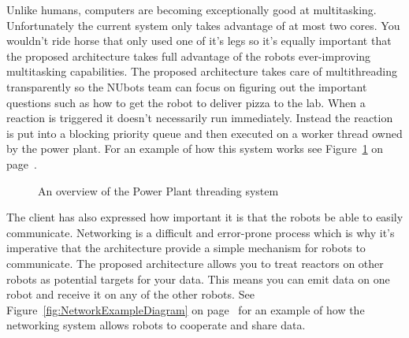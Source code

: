 \documentclass[english,12pt]{scrartcl}
\begin{document}
            Unlike humans, computers are becoming exceptionally good at multitasking. Unfortunately the current system only takes advantage of at most two cores. You wouldn't 
            ride horse that only used one of it's legs so it's equally important that the proposed architecture takes full advantage of the robots ever-improving multitasking 
            capabilities. The proposed architecture takes care of multithreading transparently so the NUbots team can focus on figuring out the important questions such as
            how to get the robot to deliver pizza to the lab. When a reaction is triggered it doesn't necessarily run immediately. Instead the reaction is put into a blocking priority queue
            and then executed on a worker thread owned by the power plant. For an example of how this system works see 
            Figure~\ref{fig:PowerPlantThreadingOverviewDiagram} on page~\pageref{fig:PowerPlantThreadingOverviewDiagram}.
            
            \begin{figure}[b]
                \begin{tikzpicture}
                \end{tikzpicture}
                \caption {An overview of the Power Plant threading system} \label{fig:PowerPlantThreadingOverviewDiagram}
            \end{figure}

            The client has also expressed how important it is that the robots be able to easily communicate. Networking is a difficult and error-prone process which is why it's imperative
            that the architecture provide a simple mechanism for robots to communicate. The proposed architecture allows you to treat reactors on other robots as potential targets
            for your data. This means you can emit data on one robot and receive it on any of the other robots. 
            See Figure~\ref{fig:NetworkExampleDiagram} on page~\pageref{fig:NetworkExampleDiagram} for an example of how the networking system allows robots to cooperate and share
            data.
\end{document}
